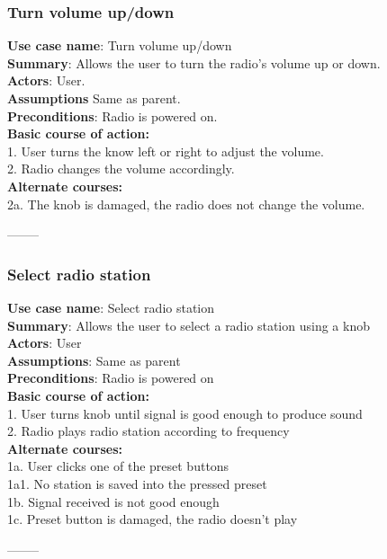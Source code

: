 \documentclass[11pt]{article}
\begin{document}
\subsubsection{Turn volume up/down}
\textbf{Use case name}: Turn volume up/down\\
\textbf{Summary}: Allows the user to turn the radio's volume up or down.\\
\textbf{Actors}: User.\\
\textbf{Assumptions}  Same as parent.\\
\textbf{Preconditions}: Radio is powered on.\\
\textbf{Basic course of action:}\\
1. User turns the know left or right to adjust the volume.\\
2. Radio changes the volume accordingly.\\
\textbf{Alternate courses: }\\
2a. The knob is damaged, the radio does not change the volume.
\begin{center}--------\end{center}

\subsubsection{Select radio station}
\textbf{Use case name}: Select radio station\\
\textbf{Summary}: Allows the user to select a radio station using a knob\\
\textbf{Actors}: User\\
\textbf{Assumptions}: Same as parent\\
\textbf{Preconditions}: Radio is powered on\\
\textbf{Basic course of action:}\\
1. User turns knob until signal is good enough to produce sound\\
2. Radio plays radio station according to frequency\\
\textbf{Alternate courses: }\\
1a. User clicks one of the preset buttons\\
\hspace*{10mm}1a1. No station is saved into the pressed preset\\
1b. Signal received is not good enough\\
1c. Preset button is damaged, the radio doesn't play
\begin{center}--------\end{center}
\end{document}
